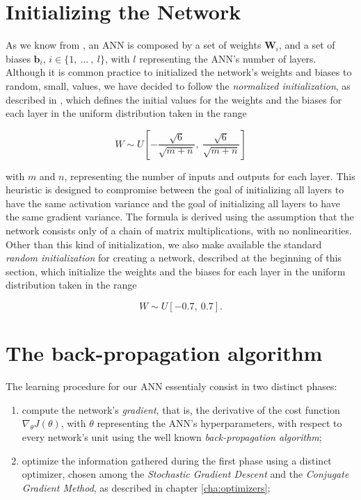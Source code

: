 	\section{Initializing the Network} %
	\label{sec:initializing_the_network}
		As we know from \cite{Goodfellow-et-al-2016,haykin2009neural,mitchell1997machine}, an ANN is composed by
		a set of weights $\mathbf{W}_{i}$, and a set of biases $\mathbf{b}_{i}$,
		$i \in \{ 1, \ \ldots \ , \ l \}$, with $l$ representing the ANN's number of layers. Although it is common
		practice to initialized the network's weights and biases to random, small, values, we have decided to
		follow the \textit{normalized initialization}, as described in
		\cite{Glorot10understandingthe,Goodfellow-et-al-2016}, which defines the initial values for the weights
		and the biases for each layer in the uniform distribution taken in the range

		\begin{equation*}
		    W \sim U \left [ -\frac{\sqrt{6}}{\sqrt{m + n}}, \ \frac{\sqrt{6}}{\sqrt{m + n}} \right ]
		\end{equation*}

		with $m$ and $n$, representing the number of inputs and outputs for each layer. This heuristic is
		designed to compromise between the goal of initializing all layers to have the same activation variance
		and the goal of initializing all layers to have the same gradient variance. The formula is derived using
		the assumption that the network consists only of a chain of matrix multiplications, with no
		nonlinearities. Other than this kind of initialization, we also make available the standard
		\textit{random initialization} for creating a network, described at the beginning of this section, which
		initialize the weights and the biases for each layer in the uniform distribution taken in the range

		\begin{equation*}
		    W \sim U \left [ - 0.7, \ 0.7 \right ].
		\end{equation*}

	\section{The back-propagation algorithm} %
	\label{sec:the_back-propagation_algorithm}
		The learning procedure for our ANN essentialy consist in two distinct phases:

		\begin{enumerate}
			\item compute the network's \textit{gradient}, that is, the derivative of the cost function
			$\nabla_{\theta} J(\theta)$, with $\theta$ representing the ANN's hyperparameters, with respect to
			every network's unit using the well known \textit{back-propagation algorithm};
			\item optimize the information gathered during the first phase using a distinct optimizer, chosen
			among the \textit{Stochastic Gradient Descent} and the \textit{Conjugate Gradient Method}, as
			described in chapter \ref{cha:optimizers};
		\end{enumerate}

